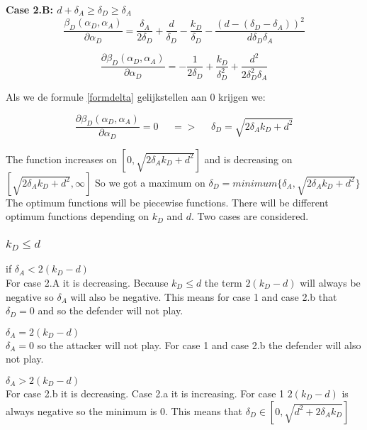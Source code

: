 \textbf{Case 2.B: $d+\delta_{A} \geq \delta_{D} \geq  \delta_{A} $} \\

\begin{equation}
\dfrac{\beta_{D}(\alpha_{D},\alpha_{A})}{\partial \alpha_{D}} = \dfrac{\delta_{A}}{2\delta_{D}} + \dfrac{d}{\delta_{D}} - \dfrac{k_{D}}{\delta_{D}} - \dfrac{(d-(\delta_{D} - \delta_{A}))^{2}}{d\delta_{D}\delta_{A}}
\end{equation}


\begin{equation}
\frac{\partial \beta_{D}(\alpha_{D},\alpha_{A})}{\partial \alpha_{D}} =  - \dfrac{1}{2\delta_{D}} + \dfrac{k_{D}}{\delta_{D}^{2}} + \dfrac{d^{2}}{2\delta_{D}^{2}\delta_{A}}
\end{equation}

Als we de formule \ref{formdelta} gelijkstellen aan 0 krijgen we:

\begin{equation}
\frac{\partial \beta_{D}(\alpha_{D},\alpha_{A})}{\partial \alpha_{D}} =0 ~~~~~~ =>~~~~~~ \delta_{D} = \sqrt{2\delta_{A}k_{D} + d^{2}}
\end{equation}


The function increases on $[0, \sqrt{2\delta_{A}k_{D} + d^{2}}]$ and is decreasing on $[\sqrt{2\delta_{A}k_{D} + d^{2}}, \infty]$ So we got a maximum on $\delta_{D} = minimum \{ \delta_{A}, \sqrt{2\delta_{A}k_{D} + d^{2}} \} $ \\


The optimum functions will be piecewise functions. There will be different optimum functions depending on $k_{D}$ and $d$. Two cases are considered.
\subsubsection{$k_{D} \leq d$}

\begin{description}
\item if $\delta_{A} < 2(k_{D} - d)$ \\
For case 2.A it is decreasing. Because $k_{D} \leq d$ the term $2(k_{D} - d)$ will always be negative so $\delta_{A}$ will also be negative. This means for case 1 and case 2.b that $\delta_{D} = 0$ and so the defender will not play.
\item $\delta_{A} = 2(k_{D} - d)$ \\
$\delta_{A} = 0$ so the attacker will not play. For case 1 and case 2.b the defender will also not play.
\item $\delta_{A} > 2(k_{D} - d)$ \\
For case 2.b it is decreasing. Case 2.a it is increasing. For case 1 $2(k_{D} - d)$ is always negative so the minimum is 0. This means that $\delta_{D} \in [0, \sqrt{d^{2} + 2\delta_{A}k_{D}}]$
\end{description}

